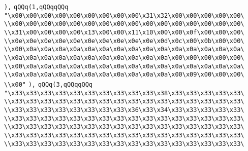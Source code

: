 \verb|),|\newline
\verb|qQQq(1,qQQqqQQq|\newline
\verb|"\x00\x00\x00\x00\x00\x00\x00\x00\x00\x31\x32\x00\x00\x00\x00\x00\|\newline
\verb|\\x00\x00\x00\x00\x00\x00\x00\x00\x00\x00\x00\x00\x00\x00\x00\x00\|\newline
\verb|\\x31\x00\x00\x00\x00\x13\x00\x00\x11\x10\x00\x00\x0f\x00\x00\x00\|\newline
\verb|\\x0e\x0e\x0e\x0e\x0e\x0e\x0e\x0e\x0e\x0e\x0d\x0c\x00\x0b\x00\x00\|\newline
\verb|\\x00\x0a\x0a\x0a\x0a\x0a\x0a\x0a\x0a\x0a\x0a\x0a\x0a\x0a\x0a\x0a\|\newline
\verb|\\x0a\x0a\x0a\x0a\x0a\x0a\x0a\x0a\x0a\x0a\x0a\x00\x00\x00\x00\x00\|\newline
\verb|\\x00\x0a\x0a\x0a\x0a\x0a\x0a\x0a\x0a\x0a\x0a\x0a\x0a\x0a\x0a\x0a\|\newline
\verb|\\x0a\x0a\x0a\x0a\x0a\x0a\x0a\x0a\x0a\x0a\x0a\x00\x09\x00\x00\x00\|\newline
\verb|\\x00"|\newline
\verb|),|\newline
\verb|qQQq(3,qQQqqQQq|\newline
\verb|"\x33\x33\x33\x33\x33\x33\x33\x33\x33\x33\x38\x33\x33\x33\x33\x33\|\newline
\verb|\\x33\x33\x33\x33\x33\x33\x33\x33\x33\x33\x33\x33\x33\x33\x33\x33\|\newline
\verb|\\x33\x33\x33\x33\x33\x33\x33\x33\x36\x33\x34\x33\x33\x33\x33\x33\|\newline
\verb|\\x33\x33\x33\x33\x33\x33\x33\x33\x33\x33\x33\x33\x33\x33\x33\x33\|\newline
\verb|\\x33\x33\x33\x33\x33\x33\x33\x33\x33\x33\x33\x33\x33\x33\x33\x33\|\newline
\verb|\\x33\x33\x33\x33\x33\x33\x33\x33\x33\x33\x33\x33\x33\x33\x33\x33\|\newline
\verb|\\x33\x33\x33\x33\x33\x33\x33\x33\x33\x33\x33\x33\x33\x33\x33\x33\|\newline
